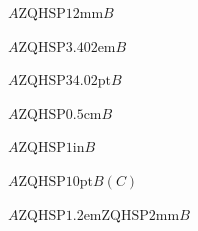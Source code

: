 $A\text{ZQHSP12mm}B$

$A\text{ZQHSP3.402em}B$

$A\text{ZQHSP34.02pt}B$

$A\text{ZQHSP0.5cm}B$

$A\text{ZQHSP1in}B$

$A\text{ZQHSP10pt}B(C)$

$A\text{ZQHSP1.2em}\text{ZQHSP2mm}B$
